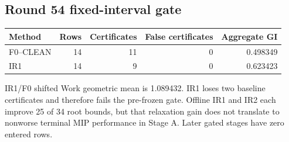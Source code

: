 \subsection{Round 54 fixed-interval gate}
\begin{center}
\small
\begin{tabular}{lrrrr}
\toprule
Method & Rows & Certificates & False certificates & Aggregate GI \\
\midrule
F0--CLEAN & 14 & 11 & 0 & 0.498349 \\
IR1 & 14 & 9 & 0 & 0.623423 \\
\bottomrule
\end{tabular}
\end{center}

IR1/F0 shifted Work geometric mean is 1.089432. IR1 loses two baseline
certificates and therefore fails the pre-frozen gate. Offline IR1 and IR2 each
improve 25 of 34 root bounds, but that relaxation gain does not translate to
nonworse terminal MIP performance in Stage A. Later gated stages have zero
entered rows.
